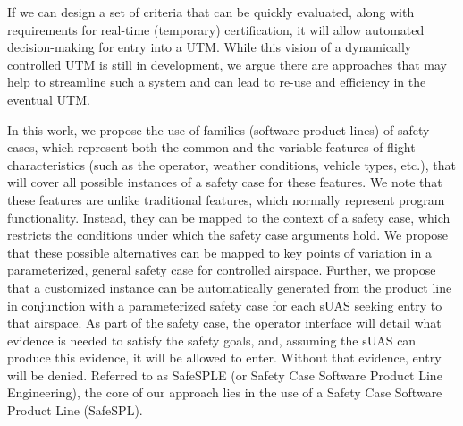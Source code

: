 If we can design a set of criteria that can be quickly evaluated, along with requirements for 
real-time (temporary) certification, it will allow automated decision-making for entry into a UTM.  While this vision of a dynamically controlled UTM is still in development, we argue there are approaches that may help to streamline such a system and can lead to re-use and efficiency in the eventual UTM.


In this work, we propose the use of families (software product lines) of safety cases, which represent both the common and the variable features of flight characteristics (such as the operator, weather conditions, vehicle types, etc.), that will cover all possible instances of a safety case for these features. We note that these features are unlike traditional features, which normally represent program functionality. Instead, they can be mapped to the context of a safety case, which restricts the conditions under which the safety case arguments hold.  We propose that these possible alternatives can be mapped to key points of variation in a parameterized, general safety case for controlled airspace. Further, we propose that a customized instance can be automatically generated from the product line in conjunction with a parameterized safety case for each sUAS seeking entry to that airspace. 
As part of the safety case, the operator interface will detail what evidence is needed to satisfy the safety goals, and, assuming the sUAS can produce this evidence, it will be allowed to enter. Without that evidence, entry will be denied.
Referred to as SafeSPLE (or Safety Case Software Product Line Engineering), the core of our approach lies in the use of a Safety Case Software Product Line (SafeSPL).


